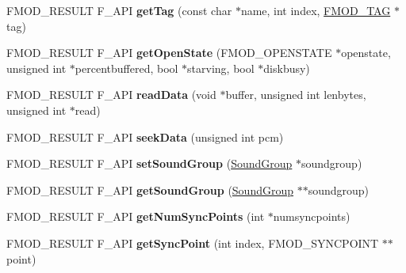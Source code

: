\begin{DoxyCompactItemize}
\item 
\mbox{\label{classFMOD_1_1Sound_abb0b254a45594e485e95ed4eab9fd1b3}} 
F\+M\+O\+D\+\_\+\+R\+E\+S\+U\+LT F\+\_\+\+A\+PI {\bfseries get\+Tag} (const char $\ast$name, int index, \hyperlink{structFMOD__TAG}{F\+M\+O\+D\+\_\+\+T\+AG} $\ast$tag)
\item 
\mbox{\label{classFMOD_1_1Sound_a2c3115f9bd9343b7d3b09b2e4edbb8b3}} 
F\+M\+O\+D\+\_\+\+R\+E\+S\+U\+LT F\+\_\+\+A\+PI {\bfseries get\+Open\+State} (F\+M\+O\+D\+\_\+\+O\+P\+E\+N\+S\+T\+A\+TE $\ast$openstate, unsigned int $\ast$percentbuffered, bool $\ast$starving, bool $\ast$diskbusy)
\item 
\mbox{\label{classFMOD_1_1Sound_af58de66a892b9e49a513502288cf930b}} 
F\+M\+O\+D\+\_\+\+R\+E\+S\+U\+LT F\+\_\+\+A\+PI {\bfseries read\+Data} (void $\ast$buffer, unsigned int lenbytes, unsigned int $\ast$read)
\item 
\mbox{\label{classFMOD_1_1Sound_ac73572153744ba36367391939cd3bc5e}} 
F\+M\+O\+D\+\_\+\+R\+E\+S\+U\+LT F\+\_\+\+A\+PI {\bfseries seek\+Data} (unsigned int pcm)
\item 
\mbox{\label{classFMOD_1_1Sound_a6433c4494cbb472ef1d9cf214749dc01}} 
F\+M\+O\+D\+\_\+\+R\+E\+S\+U\+LT F\+\_\+\+A\+PI {\bfseries set\+Sound\+Group} (\hyperlink{classFMOD_1_1SoundGroup}{Sound\+Group} $\ast$soundgroup)
\item 
\mbox{\label{classFMOD_1_1Sound_a146bf9b59d99685b313f95e3460a4b8b}} 
F\+M\+O\+D\+\_\+\+R\+E\+S\+U\+LT F\+\_\+\+A\+PI {\bfseries get\+Sound\+Group} (\hyperlink{classFMOD_1_1SoundGroup}{Sound\+Group} $\ast$$\ast$soundgroup)
\item 
\mbox{\label{classFMOD_1_1Sound_a3a8c9fd2fb487a3b3a66952f09840fbf}} 
F\+M\+O\+D\+\_\+\+R\+E\+S\+U\+LT F\+\_\+\+A\+PI {\bfseries get\+Num\+Sync\+Points} (int $\ast$numsyncpoints)
\item 
\mbox{\label{classFMOD_1_1Sound_ab091d9a05e5f30f7a3ffbe1503335d32}} 
F\+M\+O\+D\+\_\+\+R\+E\+S\+U\+LT F\+\_\+\+A\+PI {\bfseries get\+Sync\+Point} (int index, F\+M\+O\+D\+\_\+\+S\+Y\+N\+C\+P\+O\+I\+NT $\ast$$\ast$point)

\end{DoxyCompactItemize}
